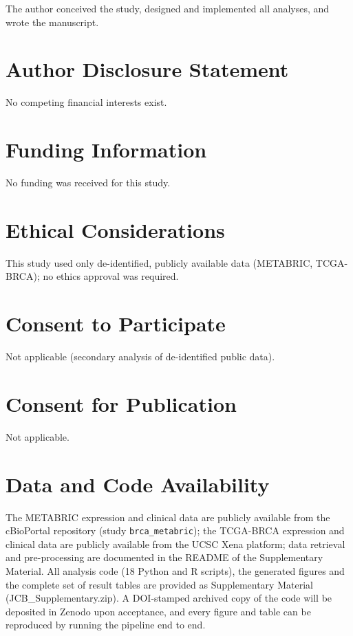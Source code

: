 \documentclass[12pt]{article}
\begin{document}
The author conceived the study, designed and implemented all analyses,
and wrote the manuscript.

\section*{Author Disclosure Statement}

No competing financial interests exist.

\section*{Funding Information}

No funding was received for this study.

\section*{Ethical Considerations}

This study used only de-identified, publicly available data (METABRIC,
TCGA-BRCA); no ethics approval was required.

\section*{Consent to Participate}

Not applicable (secondary analysis of de-identified public data).

\section*{Consent for Publication}

Not applicable.

\section*{Data and Code Availability}

The METABRIC expression and clinical data are publicly available from the
cBioPortal repository (study \texttt{brca\_metabric}); the TCGA-BRCA
expression and clinical data are publicly available from the UCSC Xena
platform; data retrieval and pre-processing are documented in the README of
the Supplementary Material. All analysis code (18 Python and R scripts),
the generated figures and the complete set of result tables are provided as
Supplementary Material (JCB\_Supplementary.zip). A DOI-stamped archived
copy of the code will be deposited in Zenodo upon acceptance, and every
figure and table can be reproduced by running the pipeline end to end.
\end{document}

